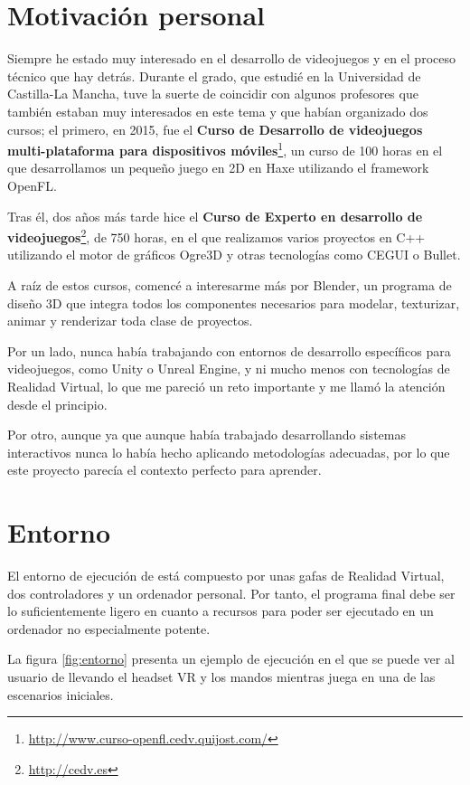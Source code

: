 \section{Motivación personal}

Siempre he estado muy interesado en el desarrollo de videojuegos y en el proceso técnico que hay detrás. Durante el grado, que estudié en la Universidad de Castilla-La Mancha, tuve la suerte de coincidir con algunos profesores que también estaban muy interesados en este tema y que habían organizado dos cursos; el primero, en 2015, fue el \textbf{Curso de Desarrollo de videojuegos multi-plataforma para dispositivos móviles}\footnote{\url{http://www.curso-openfl.cedv.quijost.com/}}, un curso de 100 horas en el que desarrollamos un pequeño juego en 2D en Haxe utilizando el framework OpenFL.

Tras él, dos años más tarde hice el \textbf{Curso de Experto en desarrollo de videojuegos}\footnote{\url{http://cedv.es}}, de 750 horas, en el que realizamos varios proyectos en C++ utilizando el motor de gráficos Ogre3D y otras tecnologías como CEGUI o Bullet.

A raíz de estos cursos, comencé a interesarme más por Blender, un programa de diseño 3D que integra todos los componentes necesarios para modelar, texturizar, animar y renderizar toda clase de proyectos.

Por un lado, nunca había trabajando con entornos de desarrollo específicos para videojuegos, como Unity o Unreal Engine, y ni mucho menos con tecnologías de Realidad Virtual, lo que me pareció un reto importante y me llamó la atención desde el principio. 

Por otro, aunque ya que aunque había trabajado desarrollando sistemas interactivos nunca lo había hecho aplicando metodologías adecuadas, por lo que este proyecto parecía el contexto perfecto para aprender.

\section{Entorno}

El entorno de ejecución de \MineRVa está compuesto por unas gafas de Realidad Virtual, dos controladores y un ordenador personal. Por tanto, el programa final debe ser lo suficientemente ligero en cuanto a recursos para poder ser ejecutado en un ordenador no especialmente potente.

La figura \ref{fig:entorno} presenta un ejemplo de ejecución en el que se puede ver al usuario de \MineRVa llevando el headset \acs{VR} y los mandos mientras juega en una de las escenarios iniciales.

